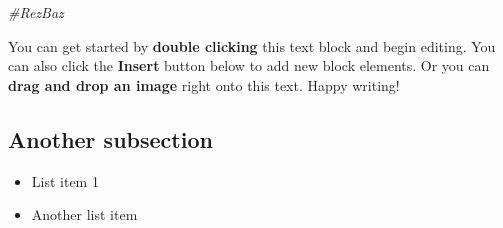 \textit{#RezBaz} 

You can get started by \textbf{double clicking} this text block and begin editing. You can also click the \textbf{Insert} button below to add new block elements. Or you can \textbf{drag and drop an image} right onto this text. Happy writing!


\subsection{Another subsection}
\begin{itemize}
\item List item 1
\item Another list item
\end{itemize}
